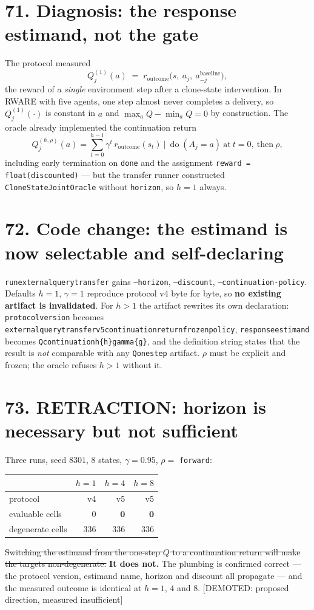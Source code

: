 \documentclass[9pt,twocolumn]{article}
\newcommand{\oldclaim}[1]{\sout{#1}}
\newcommand{\eclass}[1]{\textsf{[#1]}}
\renewcommand{\_}{\CIGunderscore\allowbreak}
\begin{document}
\section*{71. Diagnosis: the response estimand, not the gate}
The protocol measured
\[Q^{(1)}_j(a)\;=\;r_{\text{outcome}}\bigl(s,\ a_j,\ a_{-j}^{\text{baseline}}\bigr),\]
the reward of a \emph{single} environment step after a clone-state intervention. In RWARE with five agents, one step almost never completes a delivery, so $Q^{(1)}_j(\cdot)$ is constant in $a$ and $\max_a Q-\min_a Q=0$ by construction. The oracle already implemented the continuation return
\[Q^{(h,\rho)}_j(a)=\sum_{t=0}^{h-1}\gamma^{t}\,r_{\text{outcome}}(s_t)\ \Big|\ \operatorname{do}(A_j=a)\ \text{at}\ t=0,\ \text{then}\ \rho,\]
including early termination on \texttt{done} and the assignment \texttt{reward = float(discounted)} --- but the transfer runner constructed \texttt{CloneStateJointOracle} without \texttt{horizon}, so $h=1$ always.

\section*{72. Code change: the estimand is now selectable and self-declaring}
\texttt{run\_external\_query\_transfer} gains \texttt{--horizon}, \texttt{--discount}, \texttt{--continuation-policy}. Defaults $h=1$, $\gamma=1$ reproduce protocol v4 byte for byte, so \textbf{no existing artifact is invalidated}. For $h>1$ the artifact rewrites its own declaration: \texttt{protocol\_version} becomes \texttt{external\_query\_transfer\_v5\_continuation\_return\_frozen\_policy}, \texttt{response\_estimand} becomes \texttt{Q\_continuation\_h\{h\}\_gamma\{g\}}, and the definition string states that the result is \emph{not} comparable with any \texttt{Q\_one\_step} artifact. $\rho$ must be explicit and frozen; the oracle refuses $h>1$ without it.

\section*{73. RETRACTION: horizon is necessary but not sufficient}
Three runs, seed $8301$, $8$ states, $\gamma=0.95$, $\rho=$ \texttt{forward}:
\begin{center}\scriptsize
\begin{tabularx}{0.98\columnwidth}{l r r r}
\toprule
 & $h=1$ & $h=4$ & $h=8$\\
\midrule
protocol & v4 & v5 & v5\\
evaluable cells & $0$ & $\mathbf{0}$ & $\mathbf{0}$\\
degenerate cells & $336$ & $336$ & $336$\\
\bottomrule
\end{tabularx}
\end{center}
\oldclaim{Switching the estimand from the one-step $Q$ to a continuation return will make the targets non-degenerate.} \textbf{It does not.} The plumbing is confirmed correct --- the protocol version, estimand name, horizon and discount all propagate --- and the measured outcome is identical at $h=1$, $4$ and $8$. \eclass{DEMOTED: proposed direction, measured insufficient}
\end{document}
